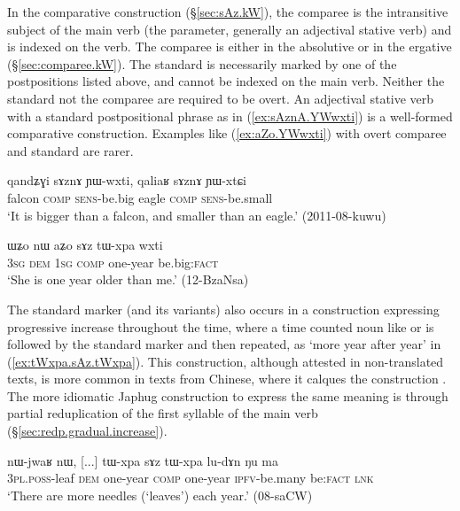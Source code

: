 In the comparative construction (§\ref{sec:sAz.kW}), the comparee is the intransitive subject of the main verb (the parameter, generally an adjectival stative verb) and is indexed on the verb. The comparee is either in the absolutive or in the ergative (§\ref{sec:comparee.kW}). The standard is necessarily marked by one of the postpositions listed above, and cannot be indexed on the main verb. Neither the standard not the comparee are required to be overt. An adjectival stative verb with a standard postpositional phrase as in  (\ref{ex:sAznA.YWwxti})  is a well-formed comparative construction. Examples like (\ref{ex:aZo.YWwxti}) with overt comparee and standard are rarer.

\begin{exe}
\ex \label{ex:sAznA.YWwxti}
\gll  qandʑɣi sɤznɤ ɲɯ-wxti, qaliaʁ sɤznɤ ɲɯ-xtɕi \\
falcon \textsc{comp} \textsc{sens}-be.big eagle \textsc{comp} \textsc{sens}-be.small \\
\glt `It is bigger than a falcon, and smaller than an eagle.' (2011-08-kuwu)
\end{exe}

\begin{exe}
\ex \label{ex:aZo.YWwxti}
\gll ɯʑo nɯ aʑo sɤz tɯ-xpa wxti  \\
\textsc{3sg} \textsc{dem} \textsc{1sg} \textsc{comp} one-year be.big:\textsc{fact} \\
\glt `She is one year older than me.' (12-BzaNsa) 	
\end{exe}

The standard marker  (and its variants) also occurs in a  construction expressing progressive increase throughout the time, where a time counted noun like  or  is followed by the standard marker and then repeated, as  `more year after year' in (\ref{ex:tWxpa.sAz.tWxpa}). This construction, although attested in non-translated texts, is more common in texts from Chinese, where it calques the construction . The more idiomatic Japhug construction to express the same meaning is through partial reduplication of the first syllable of the main verb (§\ref{sec:redp.gradual.increase}).
 
 \begin{exe}
 \ex \label{ex:tWxpa.sAz.tWxpa}
 \gll nɯ-jwaʁ nɯ, [...] tɯ-xpa sɤz tɯ-xpa lu-dɤn ŋu ma \\
 \textsc{3pl}.\textsc{poss}-leaf \textsc{dem} { } one-year \textsc{comp} one-year \textsc{ipfv}-be.many be:\textsc{fact} \textsc{lnk} \\
\glt  `There are more needles (`leaves') each year.' (08-saCW) 
\end{exe} 
 
